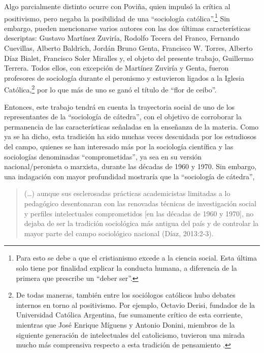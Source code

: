 Algo parcialmente distinto ocurre con Poviña, quien impulsó la crítica al positivismo, pero negaba la posibilidad de una \enquote{sociología católica}.\footnote{Para \textcite{1532-POVINA1955} esto se debe a que el cristianismo excede a la ciencia social. Esta última solo tiene por finalidad explicar la conducta humana, a diferencia de la primera que prescribe un \enquote{deber ser}.} Sin embargo, pueden mencionarse varios autores con las dos últimas características descriptas: Gustavo Martínez Zuviría, Rodolfo Tecera del Franco, Fernando Cuevillas, Alberto Baldrich, Jordán Bruno Genta, Francisco W. Torres, Alberto Díaz Bialet, Francisco Soler Miralles y, el objeto del presente trabajo, Guillermo Terrera. Todos ellos, con excepción de Martínez Zuviría y Genta, fueron profesores de sociología durante el peronismo y estuvieron ligados a la Iglesia Católica,\footnote{De todas maneras, también entre los sociólogos católicos hubo debates internos en torno al positivismo. Por ejemplo, Octavio Derisi, fundador de la Universidad Católica Argentina, fue sumamente crítico de esta corriente, mientras que José Enrique Míguens y Antonio Donini, miembros de la siguiente generación de intelectuales del catolicismo, tuvieron una mirada mucho más comprensiva respecto a esta tradición de pensamiento \parencite{281-ZANCA2006}.} por lo que más de uno se ganó el título de \enquote{flor de ceibo}.

Entonces, este trabajo tendrá en cuenta la trayectoria social de uno de los representantes de la \enquote{sociología de cátedra}, con el objetivo de corroborar la permanencia de las características señaladas en la enseñanza de la materia. Como ya se ha dicho, esta tradición ha sido muchas veces descuidada por los estudiosos del campo, quienes se han interesado más por la sociología científica y las sociologías denominadas \enquote{comprometidas}, ya sea en su versión nacional/peronista o marxista, durante las décadas de 1960 y 1970. Sin embargo, una indagación con mayor profundidad mostraría que la \enquote{sociología de cátedra},

\begin{quote}
(\dots) aunque sus esclerosadas prácticas academicistas limitadas a lo pedagógico desentonaran con las renovadas técnicas de investigación social y perfiles intelectuales comprometidos [en las décadas de 1960 y 1970], no dejaba de ser la tradición sociológica más antigua del país y de controlar la mayor parte del campo sociológico nacional (Díaz, 2013:2-3).
\end{quote}

